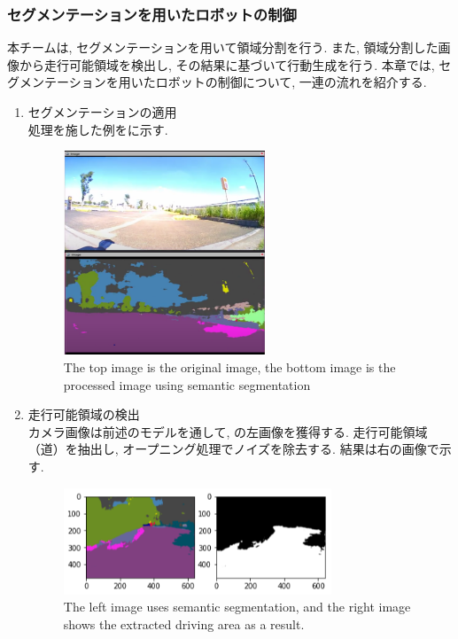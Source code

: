 \documentclass[uplatex, twocolumn, 9pt]{jsproceedings}
\begin{document}
\subsubsection{セグメンテーションを用いたロボットの制御}
本チームは, セグメンテーションを用いて領域分割を行う. また, 領域分割した画像から走行可能領域を検出し, その結果に基づいて行動生成を行う. 本章では, セグメンテーションを用いたロボットの制御について, 一連の流れを紹介する. 

\begin{enumerate}
  \item セグメンテーションの適用\\
  処理を施した例をに示す.
  \begin{figure}[h]
    \centering
    \includegraphics[width=60mm]{fig/camera_for_seg.pdf}
    \caption{The top image is the original image, the bottom image is the processed image using semantic segmentation}
    \label{fig:for_seg}%
  \end{figure}
  \newpage
  \item 走行可能領域の検出\\
  カメラ画像は前述のモデルを通して, の左画像を獲得する. 走行可能領域（道）を抽出し, オープニング処理でノイズを除去する. 結果は右の画像で示す.
  \begin{figure}[h]
    \centering
    \includegraphics[width=80mm]{fig/seg_runarea.pdf}
    \caption{The left image uses semantic segmentation, and the right image shows the extracted driving area as a result.}
    \label{fig:seg_runarea}%

\end{figure}
\end{enumerate}
\end{document}
